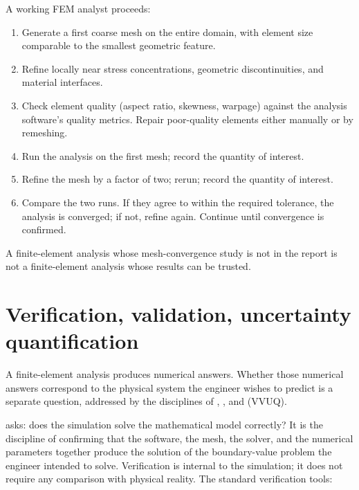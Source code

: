  A working FEM analyst
proceeds:

\begin{enumerate}
  \item Generate a first coarse mesh on the entire domain, with
    element size comparable to the smallest geometric feature.
  \item Refine locally near stress concentrations, geometric
    discontinuities, and material interfaces.
  \item Check element quality (aspect ratio, skewness, warpage)
    against the analysis software's quality metrics. Repair
    poor-quality elements either manually or by remeshing.
  \item Run the analysis on the first mesh; record the quantity
    of interest.
  \item Refine the mesh by a factor of two; rerun; record the
    quantity of interest.
  \item Compare the two runs. If they agree to within the
    required tolerance, the analysis is converged; if not,
    refine again. Continue until convergence is confirmed.
\end{enumerate}

A finite-element analysis whose mesh-convergence study is not in
the report is not a finite-element analysis whose results can be
trusted.

\section{Verification, validation, uncertainty quantification}

A finite-element analysis produces numerical answers. Whether
those numerical answers correspond to the physical system the
engineer wishes to predict is a separate question, addressed by
the disciplines of , ,
and  (VVUQ).

 asks: does the simulation solve the
mathematical model correctly? It is the discipline of confirming
that the software, the mesh, the solver, and the numerical
parameters together produce the solution of the boundary-value
problem the engineer intended to solve. Verification is internal
to the simulation; it does not require any comparison with physical
reality. The standard verification tools:

